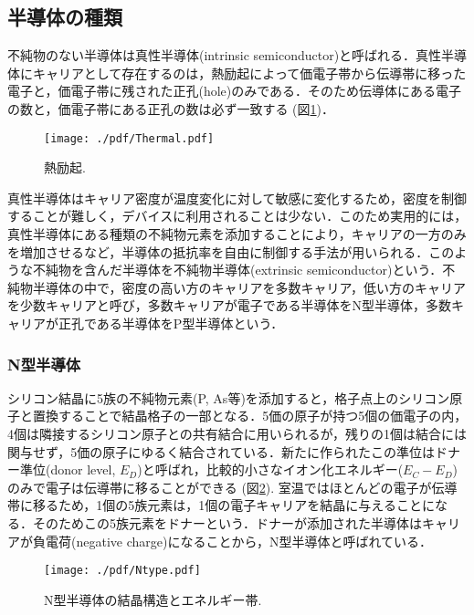 \subsection{半導体の種類}
不純物のない半導体は真性半導体(intrinsic semiconductor)と呼ばれる．真性半導体にキャリアとして存在するのは，熱励起によって価電子帯から伝導帯に移った電子と，価電子帯に残された正孔(hole)のみである．そのため伝導体にある電子の数と，価電子帯にある正孔の数は必ず一致する (図\ref{fig:Thermal})．\par
\begin{figure}[h]
	\centering
	\texttt{[image: ./pdf/Thermal.pdf]}
	\caption{熱励起.}
	\label{fig:Thermal}
\end{figure}
真性半導体はキャリア密度が温度変化に対して敏感に変化するため，密度を制御することが難しく，デバイスに利用されることは少ない．このため実用的には，真性半導体にある種類の不純物元素を添加することにより，キャリアの一方のみを増加させるなど，半導体の抵抗率を自由に制御する手法が用いられる．このような不純物を含んだ半導体を不純物半導体(extrinsic semiconductor)という．不純物半導体の中で，密度の高い方のキャリアを多数キャリア，低い方のキャリアを少数キャリアと呼び，多数キャリアが電子である半導体をN型半導体，多数キャリアが正孔である半導体をP型半導体という．\par

\subsubsection*{N型半導体}
シリコン結晶に5族の不純物元素(P, As等)を添加すると，格子点上のシリコン原子と置換することで結晶格子の一部となる．5価の原子が持つ5個の価電子の内，4個は隣接するシリコン原子との共有結合に用いられるが，残りの1個は結合には関与せず，5価の原子にゆるく結合されている．新たに作られたこの準位はドナー準位(donor level, $E_{D}$)と呼ばれ，比較的小さなイオン化エネルギー($E_{C}-E_{D}$)のみで電子は伝導帯に移ることができる (図\ref{fig:Ntype}). 室温ではほとんどの電子が伝導帯に移るため，1個の5族元素は，1個の電子キャリアを結晶に与えることになる．そのためこの5族元素をドナーという．ドナーが添加された半導体はキャリアが負電荷(negative charge)になることから，N型半導体と呼ばれている．
\begin{figure}[h]
	\centering
	\texttt{[image: ./pdf/Ntype.pdf]}
	\caption{N型半導体の結晶構造とエネルギー帯.}
	\label{fig:Ntype}
\end{figure}

